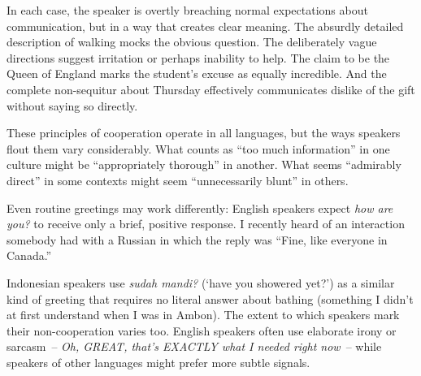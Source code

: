 \ea
   \z
\z

In each case, the speaker is overtly breaching normal expectations about communication, but in a way that creates clear meaning. The absurdly detailed description of walking mocks the obvious question. The deliberately vague directions suggest irritation or perhaps inability to help. The claim to be the Queen of England marks the student's excuse as equally incredible. And the complete non-sequitur about Thursday effectively communicates dislike of the gift without saying so directly.

These principles of cooperation operate in all languages, but the ways speakers flout them vary considerably. What counts as ``too much information'' in one culture might be ``appropriately thorough'' in another. What seems ``admirably direct'' in some contexts might seem ``unnecessarily blunt'' in others. 

Even routine greetings may work differently: English speakers expect \textit{how are you?} to receive only a brief, positive response. I recently heard of an interaction somebody had with a Russian in which the reply was ``Fine, like everyone in Canada.''

Indonesian speakers use \textit{sudah mandi?} (`have you showered yet?') as a similar kind of greeting that requires no literal answer about bathing (something I didn't at first understand when I was in Ambon). The extent to which speakers mark their non-cooperation varies too. English speakers often use elaborate irony or sarcasm~-- \textit{Oh, GREAT, that's EXACTLY what I needed right now}~-- while speakers of other languages might prefer more subtle signals.

